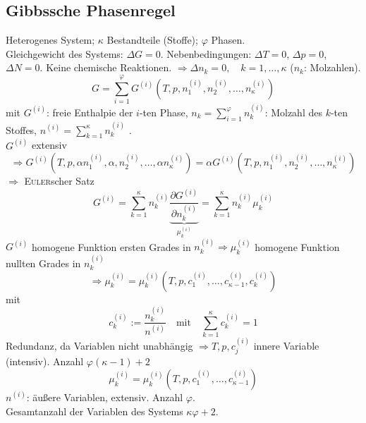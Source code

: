 \subsection{Gibbssche Phasenregel}
Heterogenes System; $\kappa$ Bestandteile (Stoffe); $\varphi$ Phasen.\\
Gleichgewicht des Systems: $\Delta G = 0$. Nebenbedingungen: $\Delta T = 0$, $\Delta p = 0$, $\Delta N = 0$. Keine chemische Reaktionen.
$\Rightarrow\Delta n_k = 0, \quad k = 1, \ldots, \kappa$ ($n_k$: Molzahlen).
\begin{equation}
    G = \sum_{i=1}^{\varphi} G^{(i)} \left( T, p, n_1^{(i)}, n_2^{(i)}, \ldots, n_\kappa^{(i)} \right)
\end{equation}
mit $G^{(i)}$: freie Enthalpie der $i$-ten Phase, $n_k = \sum_{i=1}^{\varphi} n_k^{(i)}$: Molzahl des $k$-ten Stoffes,
$n^{(i)} = \sum_{k=1}^{\kappa} n_k^{(i)}$ . \\
$G^{(i)}$ extensiv
\begin{equation}
    \Rightarrow G^{(i)} \left( T, p, \alpha n_1^{(i)}, \alpha, n_2^{(i)}, \ldots, \alpha n_\kappa^{(i)} \right) = \alpha G^{(i)} \left( T, p, n_1^{(i)}, n_2^{(i)}, \ldots, n_\kappa^{(i)} \right)
\end{equation}
$\Rightarrow$ \textsc{Euler}scher Satz
\begin{equation}
    G^{(i)} = \sum_{k=1}^{\kappa} n_k^{(i)} \underbrace{\frac{\partial G^{(i)}}{\partial n_k^{(i)}}}_{\mu_k^{(i)}} =
    \sum_{k=1}^{\kappa}  n_k^{(i)} \mu_k^{(i)}
\end{equation}
$G^{(i)}$ homogene Funktion ersten Grades in $n_k^{(i)} \Rightarrow \mu_k^{(i)}$ homogene Funktion nullten Grades in $n_k^{(i)}$
\begin{equation}
    \Rightarrow \mu_k^{(i)} = \mu_k^{(i)} \left( T, p, c_1^{(i)}, \ldots, c_{\kappa-1}^{(i)}, c_k^{(i)} \right)
\end{equation}
mit
\begin{equation}
    c_k^{(i)} := \frac{n_k^{(i)}}{n^{(i)}} \quad \text{mit} \quad \sum_{k=1}^{\kappa} c_k^{(i)} = 1
\end{equation}
Redundanz, da Variablen nicht unabhängig $\Rightarrow T, p, c_j^{(i)}$ innere Variable (intensiv). Anzahl $\varphi (\kappa - 1) + 2$
\begin{equation}
    \mu_k^{(i)} = \mu_k^{(i)} \left( T, p, c_1^{(i)}, \ldots, c_{\kappa-1}^{(i)} \right)
\end{equation}
$n^{(i)}$: äußere Variablen, extensiv. Anzahl $\varphi$. \\
Gesamtanzahl der Variablen des Systems $\kappa \varphi + 2$. \\
